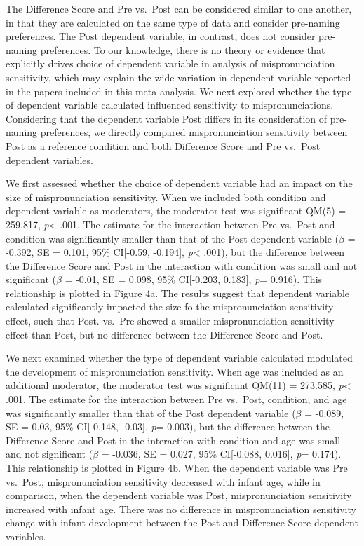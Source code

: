 \documentclass[man]{apa6}
\theoremstyle{definition}
\theoremstyle{definition}
\theoremstyle{definition}
\theoremstyle{remark}
\begin{document}
The Difference Score and Pre vs.~Post can be considered similar to one
another, in that they are calculated on the same type of data and
consider pre-naming preferences. The Post dependent variable, in
contrast, does not consider pre-naming preferences. To our knowledge,
there is no theory or evidence that explicitly drives choice of
dependent variable in analysis of mispronunciation sensitivity, which
may explain the wide variation in dependent variable reported in the
papers included in this meta-analysis. We next explored whether the type
of dependent variable calculated influenced sensitivity to
mispronunciations. Considering that the dependent variable Post differs
in its consideration of pre-naming preferences, we directly compared
mispronunciation sensitivity between Post as a reference condition and
both Difference Score and Pre vs.~Post dependent variables.

We first assessed whether the choice of dependent variable had an impact
on the size of mispronunciation sensitivity. When we included both
condition and dependent variable as moderators, the moderator test was
significant QM(5) = 259.817, \emph{p}\textless{} .001. The estimate for
the interaction between Pre vs.~Post and condition was significantly
smaller than that of the Post dependent variable (\(\beta\) = -0.392, SE
= 0.101, 95\% CI{[}-0.59, -0.194{]}, \emph{p}\textless{} .001), but the
difference between the Difference Score and Post in the interaction with
condition was small and not significant (\(\beta\) = -0.01, SE = 0.098,
95\% CI{[}-0.203, 0.183{]}, \emph{p}= 0.916). This relationship is
plotted in Figure 4a. The results suggest that dependent variable
calculated significantly impacted the size fo the mispronunciation
sensitivity effect, such that Post. vs.~Pre showed a smaller
mispronunciation sensitivity effect than Post, but no difference between
the Difference Score and Post.

We next examined whether the type of dependent variable calculated
modulated the development of mispronunciation sensitivity. When age was
included as an additional moderator, the moderator test was significant
QM(11) = 273.585, \emph{p}\textless{} .001. The estimate for the
interaction between Pre vs.~Post, condition, and age was significantly
smaller than that of the Post dependent variable (\(\beta\) = -0.089, SE
= 0.03, 95\% CI{[}-0.148, -0.03{]}, \emph{p}= 0.003), but the difference
between the Difference Score and Post in the interaction with condition
and age was small and not significant (\(\beta\) = -0.036, SE = 0.027,
95\% CI{[}-0.088, 0.016{]}, \emph{p}= 0.174). This relationship is
plotted in Figure 4b. When the dependent variable was Pre vs.~Post,
mispronunciation sensitivity decreased with infant age, while in
comparison, when the dependent variable was Post, mispronunciation
sensitivity increased with infant age. There was no difference in
mispronunciation sensitivity change with infant development between the
Post and Difference Score dependent variables.
\end{document}
